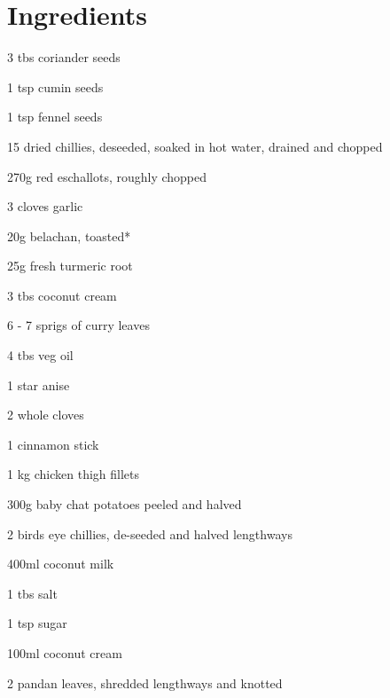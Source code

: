 \section*{Ingredients}
\begin{ingredients-list}
	\item 3 tbs coriander seeds
	\item 1 tsp cumin seeds
	\item 1 tsp fennel seeds
	\item 15 dried chillies, deseeded, soaked in hot water, drained and chopped
	\item 270g red eschallots, roughly chopped
	\item 3 cloves garlic
	\item 20g belachan, toasted* 
	\item 25g fresh turmeric root
	\item 3 tbs coconut cream
	\item 6 - 7 sprigs of curry leaves
	\item 4 tbs veg oil
	\item 1 star anise
	\item 2 whole cloves
	\item 1 cinnamon stick
	\item 1 kg chicken thigh fillets
	\item 300g baby chat potatoes peeled and halved
	\item 2 birds eye chillies, de-seeded and halved lengthways
	\item 400ml coconut milk
	\item 1 tbs salt
	\item 1 tsp sugar
	\item 100ml coconut cream
	\item 2 pandan leaves, shredded lengthways and knotted
\end{ingredients-list}


